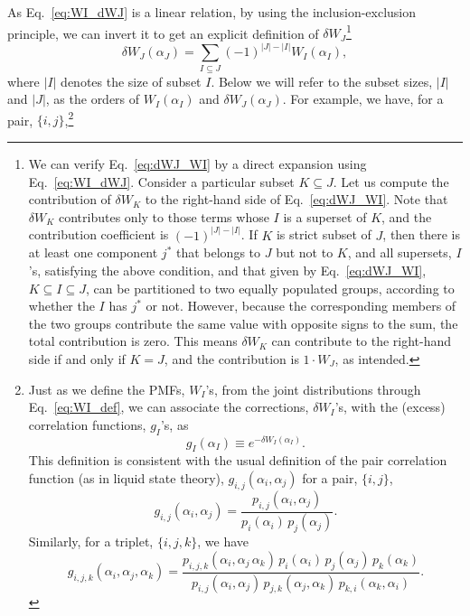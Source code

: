 \documentclass[reprint, superscriptaddress]{revtex4-1}
\begin{document}
As Eq.~\eqref{eq:WI_dWJ} is a linear relation,
by using the inclusion-exclusion principle\cite{bjorklund2007},
we can invert it to get an explicit definition of $\delta W_J$\footnote{
  We can verify Eq.~\eqref{eq:dWJ_WI}
  by a direct expansion using Eq.~\eqref{eq:WI_dWJ}.
  Consider a particular subset $K \subseteq J$.
  Let us compute the contribution of $\delta W_K$
  to the right-hand side of Eq.~\eqref{eq:dWJ_WI}.
  Note that $\delta W_K$ contributes only to those terms
  whose $I$ is a superset of $K$,
  and the contribution coefficient is $(-1)^{|J|-|I|}$.
  If $K$ is strict subset of $J$,
  then there is at least one component $j^*$ that belongs to $J$
  but not to $K$,
  and all supersets, $I$'s,
  satisfying the above condition, and that given by Eq.~\eqref{eq:dWJ_WI},
  $K \subseteq I \subseteq J$,
  can be partitioned to two equally populated groups,
  according to whether the $I$ has $j^*$ or not.
  However, because the corresponding members of the two groups
  contribute the same value with opposite signs to the sum,
  the total contribution is zero.
  This means $\delta W_K$ can contribute to the right-hand side
  if and only if $K = J$, and the contribution is $1 \cdot W_J$,
  as intended.
}
%
\begin{equation}
  \delta W_J(\alpha_J)
  =
  \sum_{I \subseteq J}
  (-1)^{|J| - |I|}
  W_I(\alpha_I)
  ,
  \label{eq:dWJ_WI}
\end{equation}
%
where $|I|$ denotes the size of subset $I$.
%
Below we will refer to the subset sizes, $|I|$ and $|J|$,
as the orders of $W_I(\alpha_I)$ and $\delta W_J(\alpha_J)$.
%
For example, we have, for a pair, $\{i, j\}$,\footnote{
  Just as we define the PMFs, $W_I$'s, from the joint distributions
  through Eq.~\eqref{eq:WI_def},
  we can associate the corrections, $\delta W_I$'s,
  with the (excess) correlation functions, $g_I$'s, as
  $$
  g_I(\alpha_I) \equiv e^{-\delta W_I(\alpha_I)}
  .
  $$
  This definition is consistent with the usual definition
  of the pair correlation function (as in liquid state theory\cite{hansen}),
  $g_{i,j}(\alpha_i, \alpha_j)$ for a pair, $\{i, j\}$,
  $$
    g_{i,j}(\alpha_i, \alpha_j)
    =
    \frac{ p_{i,j}(\alpha_i, \alpha_j) } { p_i(\alpha_i) \, p_j(\alpha_j) }
    .
  $$
  Similarly, for a triplet, $\{i, j, k\}$, we have
  $$
  g_{i,j,k}(\alpha_i, \alpha_j, \alpha_k)
  =
  \frac{ p_{i,j,k}(\alpha_i, \alpha_j \, \alpha_k) \, p_i(\alpha_i) \, p_j(\alpha_j) \, p_k(\alpha_k) }{ p_{i,j}(\alpha_i, \alpha_j) \, p_{j,k}(\alpha_j, \alpha_k) \, p_{k,i}(\alpha_k, \alpha_i) }
  .
  $$
}
\end{document}
